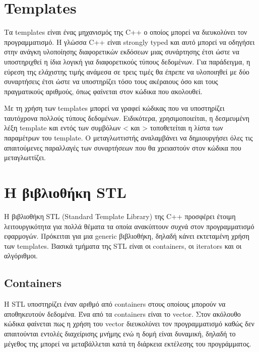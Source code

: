 \section{Templates}
Τα templates είναι ένας μηχανισμός της C++ ο οποίος μπορεί να διευκολύνει τον προγραμματισμό. Η γλώσσα C++ είναι strongly typed και αυτό μπορεί να οδηγήσει στην ανάγκη υλοποίησης διαφορετικών εκδόσεων μιας συνάρτησης έτσι ώστε να υποστηριχθεί η ίδια λογική για διαφορετικούς τύπους δεδομένων. Για παράδειγμα, η εύρεση της ελάχιστης τιμής ανάμεσα σε τρεις τιμές θα έπρεπε να υλοποιηθεί με δύο συναρτήσεις έτσι ώστε να υποστηρίζει τόσο τους ακέραιους όσο και τους πραγματικούς αριθμούς, όπως φαίνεται στον κώδικα που ακολουθεί.





Με τη χρήση των templates μπορεί να γραφεί κώδικας που να υποστηρίζει ταυτόχρονα πολλούς τύπους δεδομένων.  Ειδικότερα, χρησιμοποιείται, η δεσμευμένη λέξη template και εντός των συμβόλων < και > τοποθετείται η λίστα των παραμέτρων του template. Ο μεταγλωττιστής αναλαμβάνει να δημιουργήσει όλες τις απαιτούμενες παραλλαγές των συναρτήσεων που θα χρειαστούν στον κώδικα που μεταγλωττίζει.





\section{Η βιβλιοθήκη STL}
Η βιβλιοθήκη STL (Standard Template Library) της C++ προσφέρει έτοιμη λειτουργικότητα για πολλά θέματα τα οποία ανακύπτουν συχνά στον προγραμματισμό εφαρμογών. Πρόκειται για μια generic βιβλιοθήκη, δηλαδή κάνει εκτεταμένη χρήση των templates. Βασικά τμήματα της STL είναι οι containers, οι iterators και οι αλγόριθμοι.

\subsection{Containers}
H STL υποστηρίζει έναν αριθμό από containers στους οποίους μπορούν να αποθηκευτούν δεδομένα. Ένα από τα containers είναι το vector. Στον ακόλουθο κώδικα φαίνεται πως η χρήση του vector διευκολύνει τον προγραμματισμό καθώς δεν απαιτούνται εντολές διαχείρισης μνήμης ενώ η δομή είναι δυναμική, δηλαδή το μέγεθος της μπορεί να μεταβάλλεται κατά τη διάρκεια εκτέλεσης του προγράμματος. 

